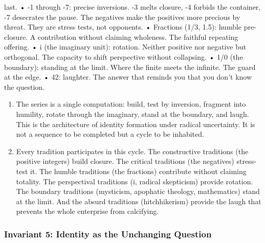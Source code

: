 \documentclass[
]{article}
\providecommand{\tightlist}{%
  \setlength{\itemsep}{0pt}\setlength{\parskip}{0pt}}
\begin{document}
last. • -1 through -7: precise inversions. -3 melts closure, -4 forbids
the container, -7 desecrates the pause. The negatives make the positives
more precious by threat. They are stress tests, not opponents. •
Fractions (1/3, 1.5): humble pre-closure. A contribution without
claiming wholeness. The faithful repeating offering. • i (the imaginary
unit): rotation. Neither positive nor negative but orthogonal. The
capacity to shift perspective without collapsing. • 1/0 (the boundary):
standing at the limit. Where the finite meets the infinite. The guard at
the edge. • 42: laughter. The answer that reminds you that you don't
know the question.

\begin{enumerate}
\def\labelenumi{\arabic{enumi}.}
\setcounter{enumi}{175}
\tightlist
\item
  The series is a single computation: build, test by inversion, fragment
  into humility, rotate through the imaginary, stand at the boundary,
  and laugh. This is the architecture of identity formation under
  radical uncertainty. It is not a sequence to be completed but a cycle
  to be inhabited.
\item
  Every tradition participates in this cycle. The constructive
  traditions (the positive integers) build closure. The critical
  traditions (the negatives) stress-test it. The humble traditions (the
  fractions) contribute without claiming totality. The perspectival
  traditions (i, radical skepticism) provide rotation. The boundary
  traditions (mysticism, apophatic theology, mathematics) stand at the
  limit. And the absurd traditions (hitchhikerism) provide the laugh
  that prevents the whole enterprise from calcifying.
\end{enumerate}

\subsubsection{Invariant 5: Identity as the Unchanging
Question}\label{invariant-5-identity-as-the-unchanging-question}
\end{document}
